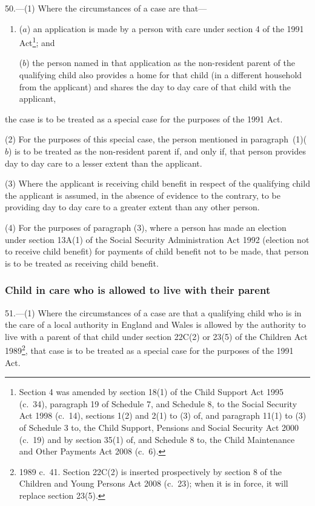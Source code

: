 \documentclass[12pt,a4paper]{article}
\begin{document}
50.---(1)  Where the circumstances of a case are that—
\begin{enumerate}\item[]
($a$) an application is made by a person with care under section 4 of the 1991 Act\footnote{Section 4 was amended by section 18(1) of the Child Support Act 1995 (c.~34), paragraph 19 of Schedule 7, and Schedule 8, to the Social Security Act 1998 (c.~14), sections 1(2) and 2(1) to (3) of, and paragraph 11(1) to (3) of Schedule 3 to, the Child Support, Pensions and Social Security Act 2000 (c.~19) and by section 35(1) of, and Schedule 8 to, the Child Maintenance and Other Payments Act 2008 (c.~6).}; and

($b$) the person named in that application as the non-resident parent of the qualifying child also provides a home for that child (in a different household from the applicant) and shares the day to day care of that child with the applicant,
\end{enumerate}
the case is to be treated as a special case for the purposes of the 1991 Act.

(2) For the purposes of this special case, the person mentioned in paragraph~(1)($b$)  is to be treated as the non-resident parent if, and only if, that person provides day to day care to a lesser extent than the applicant.

(3) Where the applicant is receiving child benefit in respect of the qualifying child the applicant is assumed, in the absence of evidence to the contrary, to be providing day to day care to a greater extent than any other person.

(4) For the purposes of paragraph (3), where a person has made an election under section 13A(1) of the Social Security Administration Act 1992 (election not to receive child benefit) for payments of child benefit not to be made, that person is to be treated as receiving child benefit.


\subsubsection[51. Child in care who is allowed to live with their parent]{Child in care who is allowed to live with their parent}

51.---(1)  Where the circumstances of a case are that a qualifying child who is in the care of a local authority in England and Wales is allowed by the authority to live with a parent of that child under section 22C(2) or 23(5) of the Children Act 1989\footnote{1989 c.~41. Section 22C(2) is inserted prospectively by section 8 of the Children and Young Persons Act 2008 (c.~23); when it is in force, it will replace section 23(5).}, that case is to be treated as a special case for the purposes of the 1991 Act.
\end{document}
